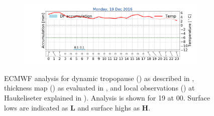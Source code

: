 \begin{figure}[!t]
	\begin{subfigure}[b]{0.49\textwidth}
		\includegraphics[trim={4.9cm 1.cm 1.5cm 1cm},clip,
		width=\textwidth]{./fig_weathermast/T_P_U_20161219}
		\caption{} \label{fig:TPU19}
	\end{subfigure}
	\caption{ECMWF analysis for dynamic tropopause (\protect{}) as described in , thickness map (\protect{}) as evaluated in , and local observations (\protect{}) at Haukeliseter explained in ). Analysis is shown for \SI{19}{\dec} at 0\SI{0}{\UTC}. Surface lows are indicated as \textbf{L} and surface highs as \textbf{H}. %
	}\label{fig:weather:19}
\end{figure}



